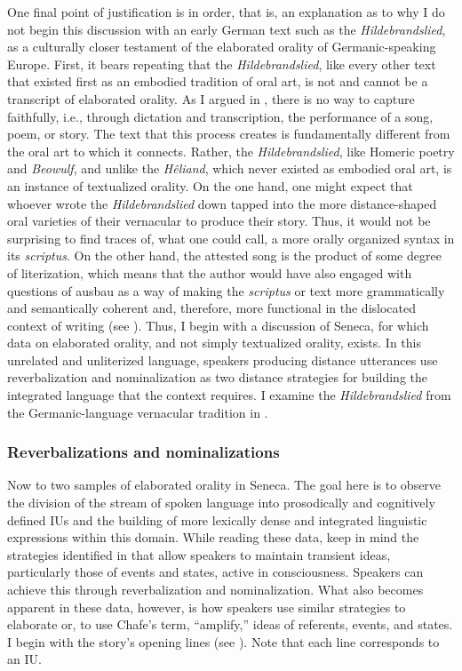   One final point of justification is in order, that is, an explanation as to why I do not begin this discussion with an early German text such as the \textit{Hildebrandslied}, as a culturally closer testament of the elaborated orality of Germanic-speaking Europe. First, it bears repeating that the \textit{Hildebrandslied}, like every other text that existed first as an embodied tradition of oral art, is not and cannot be a transcript of elaborated orality. As I argued in , there is no way to capture faithfully, i.e., through dictation and transcription, the performance of a song, poem, or story. The text that this process creates is fundamentally different from the oral art to which it connects. Rather, the \textit{Hildebrandslied}, like Homeric poetry and \textit{Beowulf}, and unlike the \textit{Hêliand}, which never existed as embodied oral art, is an instance of textualized orality. On the one hand, one might expect that whoever wrote the \textit{Hildebrandslied} down tapped into the more distance-shaped oral varieties of their vernacular to produce their story. Thus, it would not be surprising to find traces of, what one could call, a more orally organized syntax in its \textit{scriptus}. On the other hand, the attested song is the product of some degree of literization, which means that the author would have also engaged with questions of ausbau as a way of making the \textit{scriptus} or text more grammatically and semantically coherent and, therefore, more functional in the dislocated context of writing (see ). Thus, I begin with a discussion of Seneca, for which data on elaborated orality, and not simply textualized orality, exists. In this unrelated and unliterized language, speakers producing distance utterances use reverbalization and nominalization as two distance strategies for building the integrated language that the context requires. I examine the \textit{Hildebrandslied} from the Germanic-language vernacular tradition in .

\subsubsection{Reverbalizations and nominalizations}\label{sec:6.1.3.1}

  Now to two samples of elaborated orality in Seneca. The goal here is to observe the division of the stream of spoken language into prosodically and cognitively defined IUs and the building of more lexically dense and integrated linguistic expressions within this domain. While reading these data, keep in mind the strategies identified in \citet{Chafe1994} that allow speakers to maintain transient ideas, particularly those of events and states, active in consciousness. Speakers can achieve this through reverbalization and nominalization. What also becomes apparent in these data, however, is how speakers use similar strategies to elaborate or, to use Chafe’s term, “amplify,” ideas of referents, events, and states. I begin with the story’s opening lines (see \citealt[185--186]{Chafe2014}). Note that each line corresponds to an IU.

